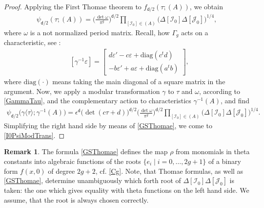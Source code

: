 \documentclass[twoside]{amsart}
\newcommand{\diag}{\mathrm{diag}}
\newcommand{\I}{\mathcal{I}}
\newcommand{\J}{\mathcal{J}}
\newcommand{\dd}{\textsf{d}}
\theoremstyle{definition}
\newtheorem{rem}{Remark}[section]
\theoremstyle{plain}
\begin{document}
\begin{proof}
Applying the First Thomae theorem to $f_{\dd/2}(\tau; (A))$, we obtain
\begin{gather}\label{GSThomae}
\psi_{\dd/2}(\tau; (A)) = \Big(\frac{\det \omega}{\pi^g}\Big)^{\dd/2} 
\prod_{[\I_0] \in (A)}  \big(\Delta[\I_0] \Delta[\J_0]\big)^{1/4},
\end{gather}
where $\omega$ is a not normalized period matrix. 
Recall, how $\Gamma_g$ acts on a characteristic,
see \cite[p.\,226]{Ig1964}:
\begin{align*}
 & [\gamma^{-1}\varepsilon] = 
 \begin{bmatrix} d \varepsilon' - c \varepsilon + \diag (c^t d) \\
- b \varepsilon'  + a \varepsilon + \diag (a^t b) \end{bmatrix},
\end{align*}
where $\diag (\cdot)$ means taking the main diagonal of a square matrix in the argument.
Now, we apply 
a modular transformation $\gamma$ to $\tau$ and $\omega$, 
according to  \eqref{GammaTau},
and the complementary action
to characteristics $\gamma^{-1} (A)$, and find 
\begin{gather*}
\psi_{\dd/2} \big(\gamma \langle \tau \rangle; \gamma^{-1} (A) \big) = 
\epsilon^{\dd} \big(\!\det (c\tau+d) \big)^{\dd/2} \Big(\frac{\det \omega}{\pi^g}\Big)^{\dd/2} 
\prod_{[\I_0] \in (A)}  \big(\Delta[\I_0] \Delta[\J_0]\big)^{1/4}.
\end{gather*}
Simplifying the right hand side by means of \eqref{GSThomae}, we   
come to \eqref{I0PsiModTrans}.
\end{proof}


\begin{rem}
The formula \eqref{GSThomae} defines the map $\rho$  from monomials in theta constants into
algebraic functions of the roots $\{e_i \mid i=0,\dots,2g+1\}$ of a binary form $f(x,0)$ of degree $2g+2$,
cf. \eqref{Cg}. Note, that Thomae formulas, as well as \eqref{GSThomae},
determine unambiguously which forth root of $\Delta[\I_0] \Delta[\J_0]$ is taken: the one
which gives equality with theta functions on the left hand side. We assume, that 
the root is always chosen correctly.
\end{rem}
\end{document}
